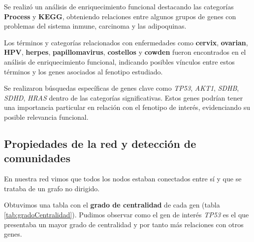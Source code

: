 Se realizó un análisis de enriquecimiento funcional destacando las categorías \textbf{Process} y \textbf{KEGG}, obteniendo relaciones entre algunos grupos de genes con problemas del sistema inmune, carcinoma y las adipoquinas.

Los términos y categorías relacionados con enfermedades como \textbf{cervix}, \textbf{ovarian}, \textbf{HPV}, \textbf{herpes}, \textbf{papillomavirus}, \textbf{costellos} y \textbf{cowden} fueron encontrados en el análisis de enriquecimiento funcional, indicando posibles vínculos entre estos términos y los genes asociados al fenotipo estudiado.

Se realizaron búsquedas específicas de genes clave como \textit{TP53}, \textit{AKT1}, \textit{SDHB}, \textit{SDHD}, \textit{HRAS} dentro de las categorías significativas. Estos genes podrían tener una importancia particular en relación con el fenotipo de interés, evidenciando su posible relevancia funcional.



\subsection{Propiedades de la red y detección de comunidades} \label{sec:propiedades}

En nuestra red vimos que todos los nodos estaban conectados entre sí y que se trataba de un grafo no dirigido.

\vspace{3pt}

Obtuvimos una tabla con el \textbf{grado de centralidad} de cada gen (tabla \ref{tab:gradoCentralidad}). Pudimos observar como el gen de interés \textit{TP53} es el que presentaba un mayor grado de centralidad y por tanto más relaciones con otros genes. 



